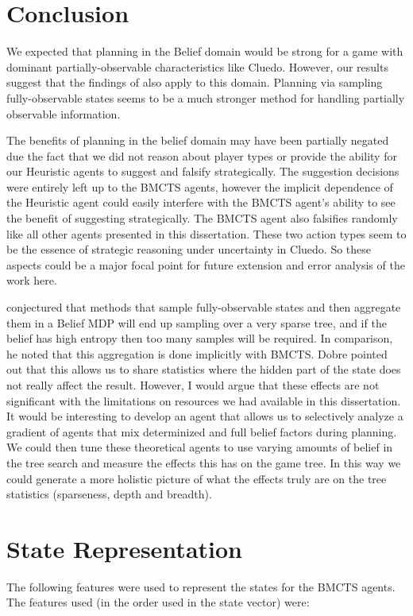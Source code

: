 \documentclass[msc, ai, logo, twoside, notimes, parskip, leftchapter, normalheadings]{infthesis}
\begin{document}
\chapter{Conclusion}
We expected that planning in the Belief domain would be strong for a game with dominant partially-observable characteristics like Cluedo. However, our results suggest that the findings of \citep{Mihai} also apply to this domain. Planning via sampling fully-observable states seems to be a much stronger method for handling partially observable information. 

The benefits of planning in the belief domain may have been partially negated due the fact that we did not reason about player types or provide the ability for our Heuristic agents to suggest and falsify strategically. The suggestion decisions were entirely left up to the BMCTS agents, however the implicit dependence of the Heuristic agent could easily interfere with the BMCTS agent's ability to see the benefit of suggesting strategically. The BMCTS agent also falsifies randomly like all other agents presented in this dissertation. These two action types seem to be the essence of strategic reasoning under uncertainty in Cluedo. So these aspects could be a major focal point for future extension and error analysis of the work here.

\citep{Mihai} conjectured that methods that sample fully-observable states and then aggregate them in a Belief MDP will end up sampling over a very sparse tree, and if the belief has high entropy then too many samples will be required. In comparison, he noted that this aggregation is done implicitly with BMCTS. Dobre pointed out that this allows us to share statistics where the hidden part of the state does not really affect the result. However, I would argue that these effects are not significant with the limitations on resources we had available in this dissertation. It would be interesting to develop an agent that allows us to selectively analyze a gradient of agents that mix determinized and full belief factors during planning. We could then tune these theoretical agents to use varying amounts of belief in the tree search and measure the effects this has on the game tree. In this way we could generate a more holistic picture of what the effects truly are on the tree statistics (sparseness, depth and breadth). 


\appendix
\chapter{State Representation}
The following features were used to represent the states for the BMCTS agents. The features used (in the order used in the state vector) were:
\end{document}

